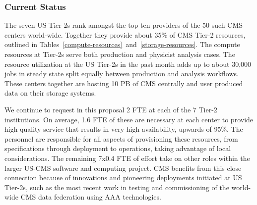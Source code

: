 \documentclass[11pt,a4paper]{article}
\begin{document}
\subsubsection{Current Status}

The seven US Tier-2s rank amongst the top ten providers of the 50 such 
CMS centers world-wide. Together they provide about 35\% of CMS
Tier-2 resources, outlined in Tables~\ref{compute-resources}~and~\ref{storage-resources}.  
The compute resources at Tier-2s serve both production and physicist analysis cases.  
The resource utilization at the US Tier-2s in the past month adds up to about 30,000 jobs 
in steady state split equally between production and analysis workflows. 
These centers together are hosting 10 PB of CMS centrally and
user produced data on their storage systems.


We continue to request in this proposal 2 FTE at each of the 7 Tier-2 institutions.
On average, 1.6 FTE of these are necessary at each center to provide high-quality service that results in 
very high availability, upwards of 95\%. The personnel are responsible
for all aspects of provisioning these resources, from specifications through
deployment to operations, taking advantage of local considerations. 
The remaining 7x0.4 FTE of effort take 
on other roles within the larger US-CMS software and computing project.  
CMS benefits from this close connection because of innovations and pioneering deployments initiated at US Tier-2s, such as
the most recent work in testing and commissioning of the world-wide
CMS data federation using AAA technologies.
\end{document}
